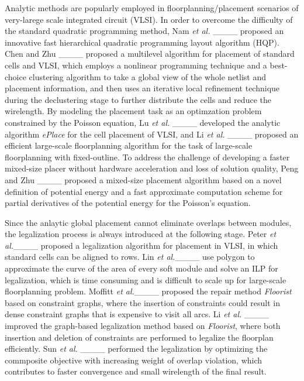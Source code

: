 Analytic methods are popularly employed in floorplanning/placement scenarios of very-larege scale integrated circuit (VLSI). In order to overcome the difficulty of the standard quadratic programming method, Nam \emph{et al.} ____ proposed an innovative fast hierarchical quadratic programming layout algorithm (HQP). Chen and Zhu ____ proposed a multilevel algorithm for placement of standard cells and VLSI, which employs a nonlinear programming technique and a best-choice clustering algorithm to take a global view of the whole netlist and placement information, and then uses an iterative local refinement technique during the declustering stage to further distribute the cells and reduce the wirelength. By modeling the placement task as an optimzation problem constrained by the Poisson equation, Lu \emph{et al.}  ____ developed the analytic algorithm \emph{ePlace} for the cell placement of VLSI, and  Li \emph{et al.} ____ proposed an efficient large-scale floorplanning algorithm for the task of large-scale floorplanning with fixed-outline. To address the challenge of developing a faster mixed-size placer without hardware acceleration and loss of solution quality, Peng and Zhu ____ proposed a mixed-size placement algorithm based on a novel definition of potential energy  and a fast approximate computation scheme for partial derivatives of the potential energy for the Poisson’s equation.

 Since the anlaytic global placement cannot eliminate overlaps between modules, the legalization process is always introduced at the following stage.
 Peter \emph{et al.}____ proposed a legalization algorithm for placement in VLSI, in which standard cells can be aligned to rows. Lin \emph{et al.}____ use polygon to approximate the curve of the area of every soft module and solve an ILP for legalization, which is time consuming and is difficult to scale up for large-scale floorplanning problem. Moffitt \emph{et al.}____ proposed the repair method \emph{Floorist} based on constraint graphs, where the insertion of constraints could result in dense constraint graphs that is expensive to visit all arcs. Li \emph{et al.} ____ improved the graph-based legalization method based on \emph{Floorist}, where both insertion and deletion of constraints are performed to legalize the floorplan efficiently. Sun \emph{et al.} ____ performed the legalization by optimizing the commposite objective with increasing weight of overlap violation, which contributes to faster convergence and small wirelength of the final result.



